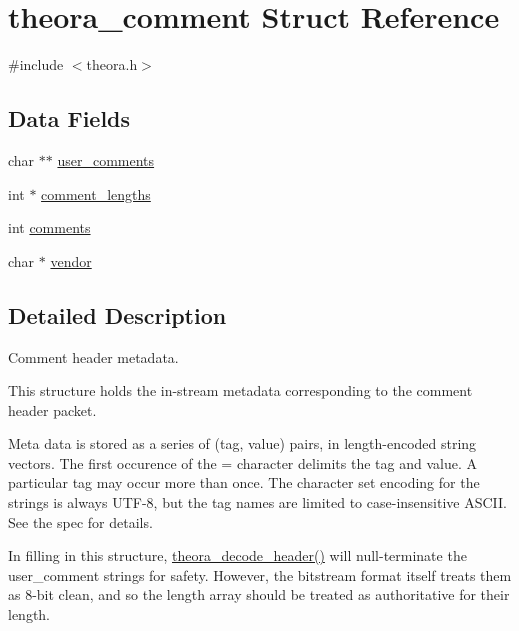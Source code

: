 \hypertarget{structtheora__comment}{}\section{theora\+\_\+comment Struct Reference}
\label{structtheora__comment}


{\ttfamily \#include $<$theora.\+h$>$}

\subsection*{Data Fields}
\begin{DoxyCompactItemize}
\item 
char $\ast$$\ast$ \hyperlink{structtheora__comment_a1e236fd180dfce19be89081399444cf5}{user\+\_\+comments}
\item 
int $\ast$ \hyperlink{structtheora__comment_a5ab4a376d3c217282a684577c9c9f49a}{comment\+\_\+lengths}
\item 
int \hyperlink{structtheora__comment_a122393035c8352ff9be42d69e73aee00}{comments}
\item 
char $\ast$ \hyperlink{structtheora__comment_adb371baf8f0daed42af8b875cf8430ef}{vendor}
\end{DoxyCompactItemize}


\subsection{Detailed Description}
Comment header metadata.

This structure holds the in-\/stream metadata corresponding to the \textquotesingle{}comment\textquotesingle{} header packet.

Meta data is stored as a series of (tag, value) pairs, in length-\/encoded string vectors. The first occurence of the \textquotesingle{}=\textquotesingle{} character delimits the tag and value. A particular tag may occur more than once. The character set encoding for the strings is always U\+T\+F-\/8, but the tag names are limited to case-\/insensitive A\+S\+C\+II. See the spec for details.

In filling in this structure, \hyperlink{group__oldfuncs_ga02915e63c1bd733ee291f577a8b75a82}{theora\+\_\+decode\+\_\+header()} will null-\/terminate the user\+\_\+comment strings for safety. However, the bitstream format itself treats them as 8-\/bit clean, and so the length array should be treated as authoritative for their length. 


